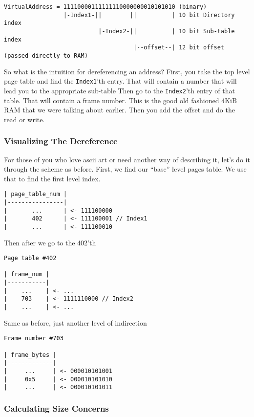 \begin{verbatim}
VirtualAddress = 11110000111111110000000010101010 (binary)
                 |-Index1-||        ||          | 10 bit Directory index
                           |-Index2-||          | 10 bit Sub-table index
                                     |--offset--| 12 bit offset (passed directly to RAM)
\end{verbatim}

So what is the intuition for dereferencing an address?
First, you take the top level page table and find the \texttt{Index1}'th entry.
That will contain a number that will lead you to the appropriate sub-table
Then go to the \texttt{Index2}'th entry of that table.
That will contain a frame number.
This is the good old fashioned 4KiB RAM that we were talking about earlier.
Then you add the offset and do the read or write.

\subsubsection{Visualizing The Dereference}

For those of you who love ascii art or need another way of describing it, let's do it through the scheme as before.
First, we find our ``base'' level pages table.
We use that  to find the first level index.

\begin{verbatim}
| page_table_num |
|----------------|
|       ...      | <- 111100000
|       402      | <- 111100001 // Index1
|       ...      | <- 111100010
\end{verbatim}

Then after we go to the 402'th 


\begin{verbatim}
Page table #402

| frame_num |
|-----------|
|    ...    | <- ...
|    703    | <- 1111110000 // Index2
|    ...    | <- ...
\end{verbatim}

Same as before, just another level of indirection

\begin{verbatim}
Frame number #703

| frame_bytes |
|-------------|
|     ...     | <- 000010101001
|     0x5     | <- 000010101010
|     ...     | <- 000010101011
\end{verbatim}

\subsubsection{Calculating Size Concerns}

